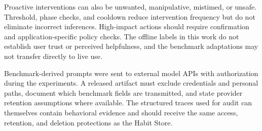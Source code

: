 \documentclass[sigconf,anonymous,review]{acmart}
\begin{document}
Proactive interventions can also be unwanted, manipulative, mistimed, or unsafe.
Threshold, phase checks, and cooldown reduce intervention frequency but do not eliminate incorrect inferences.
High-impact actions should require confirmation and application-specific policy checks.
The offline labels in this work do not establish user trust or perceived helpfulness, and the benchmark adaptations may not transfer directly to live use.

Benchmark-derived prompts were sent to external model APIs with authorization during the experiments.
A released artifact must exclude credentials and personal paths, document which benchmark fields are transmitted, and state provider retention assumptions where available.
The structured traces used for audit can themselves contain behavioral evidence and should receive the same access, retention, and deletion protections as the Habit Store.

% 
% 
\end{document}
